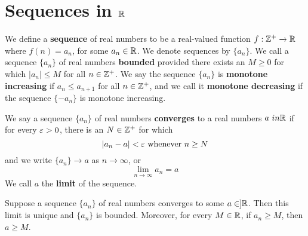 \section{Sequences in $\mathbb{R}$}

\begin{definition}
    We define a \textbf{sequence} of real numbers to be a real-valued function
    $f:\mathbb{Z}^+ \xrightarrow{} \mathbb{R}$ where $f(n)=a_n$, for some $a_n \in \mathbb{R}$. We
    denote sequences by  $\{a_n\}$. We call a sequence $\{a_n\}$ of real numbers
    \textbf{bounded} provided there exists an $M \geq 0$ for which  $|a_n| \leq
    M$ for all  $n \in \mathbb{Z}^+$. We say the sequence  $\{a_n\}$ is \textbf{monotone
    increasing} if $a_n \leq a_{n+1}$ for all $n \in \mathbb{Z}^+$, and we call it
    \textbf{monotone decreasing} if the sequence $\{-a_n\}$ is monotone
    increasing.
\end{definition}

\begin{definition}
    We say a sequence $\{a_n\}$ of real numbers \textbf{converges} to a real
    numbers $a\ in \mathbb{R}$ if for every  $\varepsilon>0$, there is an  $N \in \mathbb{Z}^+$ for which
    \begin{equation*}
        |a_n-a|<\varepsilon \text{ whenever } n \geq N
    \end{equation*}
    and we write $\{a_n\} \xrightarrow{} a$ as $n \xrightarrow{} \infty$, or
    \begin{equation*}
        \lim_{n \xrightarrow{} \infty}{a_n}=a
    \end{equation*}
    We call $a$ the  \textbf{limit} of the sequence.
\end{definition}

\begin{lemma}\label{1.3.1}
    Suppose a sequence $\{a_n\}$ of real numbers converges to some $a \in ]\mathbb{R}$.
    Then this limit is unique and  $\{a_n\}$ is bounded. Moreover, for every $M
    \in \mathbb{R}$, if  $a_n \geq M$, then  $a \geq M$.
\end{lemma}

